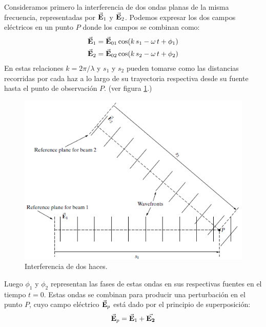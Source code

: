 \documentclass[14pt]{extarticle}
\begin{document}
Consideramos primero la interferencia de dos ondas planas de la misma frecuencia, representadas por $\va{E}_{1}$ y $\va{E}_{2}$. Podemos expresar los dos campos eléctricos en un punto $P$ donde los campos se combinan como:
\begin{eqnarray}
\va{E}_{1} &= \va{E}_{01} \cos (k \,s_{1} - \omega \, t + \phi_{1}) \label{eq:ecuacion_07_01} \\
\va{E}_{2} &= \va{E}_{02} \cos (k \,s_{2} - \omega \, t + \phi_{2}) \label{eq:ecuacion_07_02}
\end{eqnarray}
En estas relaciones $k = 2 \pi / \lambda$ y $s_{1}$ y $s_{2}$ pueden tomarse como las distancias recorridas por cada haz a lo largo de su trayectoria respectiva desde su fuente hasta el punto de observación $P$. (ver figura \ref{fig:figura_07_01}.)
\begin{figure}[H]
    \centering
    \includegraphics[scale=0.7]{Imagenes/Interferencia2_01.png}
    \caption{Interferencia de dos haces.}
    \label{fig:figura_07_01}
\end{figure}
Luego $\phi_{1}$ y $\phi_{2}$ representan las fases de estas ondas en sus respectivas fuentes en el tiempo $t = 0$. Estas ondas se combinan para producir una perturbación en el punto $P$, cuyo campo eléctrico $\va{E}_{p}$ está dado por el principio de superposición:
\begin{align*}
\va{E}_{p} = \va{E}_{1} + \va{E_{2}}
\end{align*}
\end{document}
